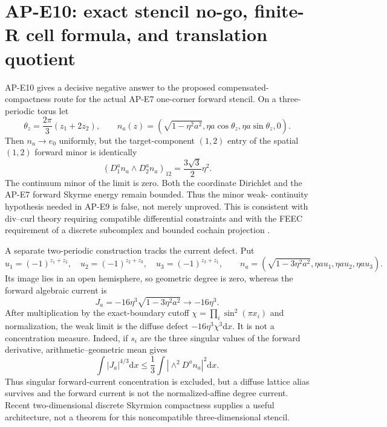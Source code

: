 \documentclass[11pt]{article}
\numberwithin{equation}{section}
\newcommand{\dd}{\mathrm d}
\begin{document}
\section{AP-E10: exact stencil no-go, finite-R cell formula, and translation quotient}

AP-E10 gives a decisive negative answer to the proposed compensated-
compactness route for the actual AP-E7 one-corner forward stencil.  On a
three-periodic torus let
\begin{equation}
 \theta_z=\frac{2\pi}{3}(z_1+2z_2),\qquad
 n_a(z)=\left(\sqrt{1-\eta^2a^2},
 \eta a\cos\theta_z,\eta a\sin\theta_z,0\right).
 \label{eq:e10-minor-sequence}
\end{equation}
Then $n_a\to e_0$ uniformly, but the target-component $(1,2)$ entry of the
spatial $(1,2)$ forward minor is identically
\begin{equation}
 \boxed{(D_1^an_a\wedge D_2^an_a)_{12}
 =\frac{3\sqrt3}{2}\eta^2.}
 \label{eq:e10-minor-defect}
\end{equation}
The continuum minor of the limit is zero.  Both the coordinate Dirichlet and
the AP-E7 forward Skyrme energy remain bounded.  Thus the minor weak-
continuity hypothesis needed in AP-E9 is false, not merely unproved.
This is consistent with div--curl theory requiring compatible differential
constraints \cite{BrianeCasadoDiaz2016} and with the FEEC requirement of a
discrete subcomplex and bounded cochain projection
\cite{ArnoldFalkWinther2010}.

A separate two-periodic construction tracks the current defect.  Put
\begin{equation}
 u_1=(-1)^{z_1+z_2},\quad u_2=(-1)^{z_2+z_3},\quad
 u_3=(-1)^{z_3+z_1},\qquad
 n_a=(\sqrt{1-3\eta^2a^2},\eta a u_1,\eta a u_2,\eta a u_3).
\end{equation}
Its image lies in an open hemisphere, so geometric degree is zero, whereas
the forward algebraic current is
\begin{equation}
 J_a=-16\eta^3\sqrt{1-3\eta^2a^2}\longrightarrow-16\eta^3.
 \label{eq:e10-current-defect}
\end{equation}
After multiplication by the exact-boundary cutoff
$\chi=\prod_i\sin^2(\pi x_i)$ and normalization, the weak limit is the
diffuse defect $-16\eta^3\chi^3\dd x$.  It is not a concentration measure.
Indeed, if $s_i$ are the three singular values of the forward derivative,
arithmetic--geometric mean gives
\begin{equation}
 \boxed{\int|J_a|^{4/3}\dd x\le
 \frac13\int|\wedge^2D^an_a|^2\dd x.}
 \label{eq:e10-l43}
\end{equation}
Thus singular forward-current concentration is excluded, but a diffuse
lattice alias survives and the forward current is not the normalized-affine
degree current.  Recent two-dimensional discrete Skyrmion compactness
\cite{BrianiCicaleseKreutz2026} supplies a useful architecture, not a theorem
for this noncompatible three-dimensional stencil.
\end{document}
